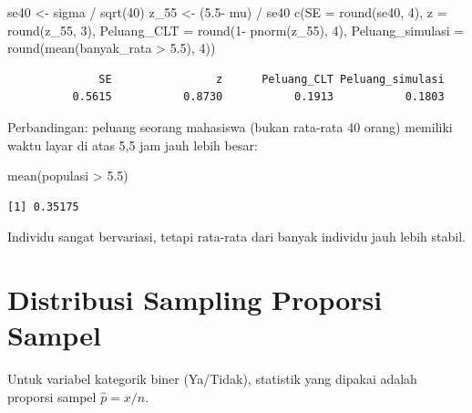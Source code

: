 \documentclass[
  indonesian,
  letterpaper,
]{book}
\newenvironment{Shaded}{\begin{snugshade}}{\end{snugshade}}
\newcommand{\AttributeTok}[1]{\textcolor[rgb]{0.40,0.45,0.13}{#1}}
\newcommand{\DecValTok}[1]{\textcolor[rgb]{0.68,0.00,0.00}{#1}}
\newcommand{\FloatTok}[1]{\textcolor[rgb]{0.68,0.00,0.00}{#1}}
\newcommand{\FunctionTok}[1]{\textcolor[rgb]{0.28,0.35,0.67}{#1}}
\newcommand{\NormalTok}[1]{\textcolor[rgb]{0.00,0.23,0.31}{#1}}
\newcommand{\OtherTok}[1]{\textcolor[rgb]{0.00,0.23,0.31}{#1}}
\newcommand{\SpecialCharTok}[1]{\textcolor[rgb]{0.37,0.37,0.37}{#1}}
\begin{document}
\begin{Shaded}
\begin{Highlighting}[]
\NormalTok{se40 }\OtherTok{\textless{}{-}}\NormalTok{ sigma }\SpecialCharTok{/} \FunctionTok{sqrt}\NormalTok{(}\DecValTok{40}\NormalTok{)}
\NormalTok{z\_55 }\OtherTok{\textless{}{-}}\NormalTok{ (}\FloatTok{5.5}\SpecialCharTok{{-}}\NormalTok{ mu) }\SpecialCharTok{/}\NormalTok{ se40}
\FunctionTok{c}\NormalTok{(}\AttributeTok{SE =} \FunctionTok{round}\NormalTok{(se40, }\DecValTok{4}\NormalTok{), }\AttributeTok{z =} \FunctionTok{round}\NormalTok{(z\_55, }\DecValTok{3}\NormalTok{),}
\AttributeTok{Peluang\_CLT =} \FunctionTok{round}\NormalTok{(}\DecValTok{1}\SpecialCharTok{{-}} \FunctionTok{pnorm}\NormalTok{(z\_55), }\DecValTok{4}\NormalTok{),}
\AttributeTok{Peluang\_simulasi =} \FunctionTok{round}\NormalTok{(}\FunctionTok{mean}\NormalTok{(banyak\_rata }\SpecialCharTok{\textgreater{}} \FloatTok{5.5}\NormalTok{), }\DecValTok{4}\NormalTok{))}
\end{Highlighting}
\end{Shaded}

\begin{verbatim}
              SE                z      Peluang_CLT Peluang_simulasi 
          0.5615           0.8730           0.1913           0.1803 
\end{verbatim}

Perbandingan: peluang seorang mahasiswa (bukan rata-rata 40 orang)
memiliki waktu layar di atas 5,5 jam jauh lebih besar:

\begin{Shaded}
\begin{Highlighting}[]
\FunctionTok{mean}\NormalTok{(populasi }\SpecialCharTok{\textgreater{}} \FloatTok{5.5}\NormalTok{)}
\end{Highlighting}
\end{Shaded}

\begin{verbatim}
[1] 0.35175
\end{verbatim}

Individu sangat bervariasi, tetapi rata-rata dari banyak individu jauh
lebih stabil.


\chapter{Distribusi Sampling Proporsi
Sampel}\label{distribusi-sampling-proporsi-sampel}

Untuk variabel kategorik biner (Ya/Tidak), statistik yang dipakai adalah
proporsi sampel \(\hat{p} = x/n\).
\end{document}
